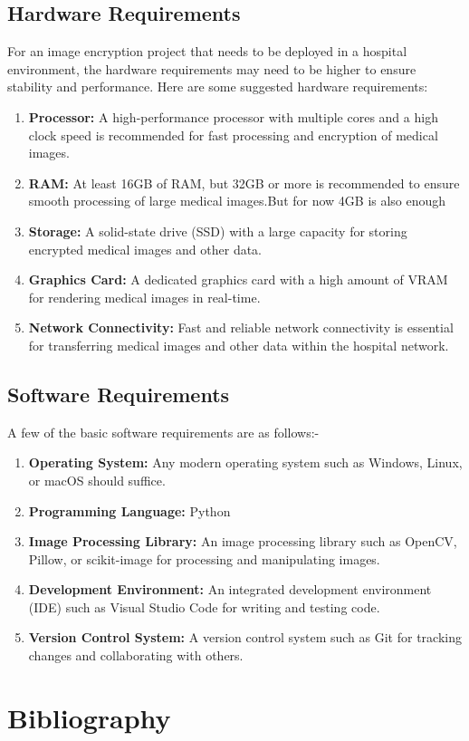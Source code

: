 \documentclass[12pt,a4paper,english]{article}
\begin{document}
\subsection[short]{Hardware Requirements}
For an image encryption project that needs to be deployed in a hospital environment, the hardware requirements may need to be higher to ensure stability and performance. Here are some suggested hardware requirements:
\begin{enumerate}
    \item \textbf{Processor:} A high-performance processor with multiple cores and a high clock speed is recommended for fast processing and encryption of medical images.

    \item \textbf{RAM:} At least 16GB of RAM, but 32GB or more is recommended to ensure smooth processing of large medical images.But for now 4GB is also enough

    \item \textbf{Storage:} A solid-state drive (SSD) with a large capacity for storing encrypted medical images and other data.

    \item \textbf{Graphics Card:} A dedicated graphics card with a high amount of VRAM for rendering medical images in real-time.

    \item \textbf{Network Connectivity:} Fast and reliable network connectivity is essential for transferring medical images and other data within the hospital network.
\end{enumerate}
\subsection[short]{Software Requirements}
A few of the basic software requirements are as follows:-
\begin{enumerate}
    \item \textbf{Operating System:} Any modern operating system such as Windows, Linux, or macOS should suffice.

    \item \textbf{Programming Language:} Python

    \item \textbf{Image Processing Library:} An image processing library such as OpenCV, Pillow, or scikit-image for processing and manipulating images.

    \item \textbf{Development Environment:} An integrated development environment (IDE) such as Visual Studio Code for writing and testing code.

    \item \textbf{Version Control System:} A version control system such as Git for tracking changes and collaborating with others.

\end{enumerate}
\newpage
\section{Bibliography}

\nocite{*}
\end{document}
